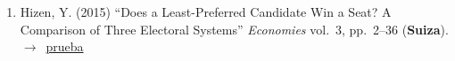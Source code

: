 \documentclass[12 pt, letter]{article}
\newenvironment{CitasMiTrabajo}{
    \begin{footnotesize}
    \begin{enumerate}[label={\footnotesize\emph{cita~\arabic*}},ref=\arabic*] %
        \setlength{\itemsep}{.1\itemsep}
        \setlength{\parskip}{.1\parskip}
    }{\end{enumerate}\end{footnotesize}}
\begin{document}
\begin{CitasMiTrabajo}
        \item Hizen, Y. (2015)
        ``Does a Least-Preferred Candidate Win a Seat? A Comparison of Three Electoral Systems''
        \emph{Economies} vol.\ 3, pp.\ 2--36 (\textbf{Suiza}). $\rightarrow$~\href{http://ericmagar.com/cv/cites/mrs/hizenThreeSystems2015economies.pdf}{prueba}

        \label{ncites:magar.etal.1998} %

%
%
%
%
%
%
%
%
%
%

        \end{CitasMiTrabajo}
\end{document}
